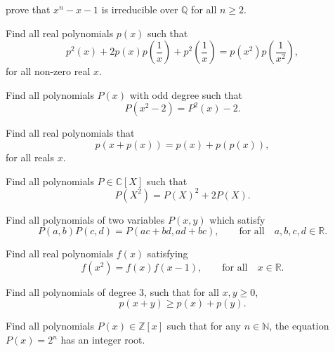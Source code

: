 \documentclass[12pt,a4paper]{memoir}
\theoremstyle{definition}
\begin{document}
\begin{question}
	prove that $x^n-x-1$ is irreducible over $\mathbb{Q}$ for all $n \geq 2$.
\end{question}



\begin{question}
	Find all real polynomials $p(x)$ such that 
	\[p^{2}(x)+2p(x)p\left(\frac{1}{x}\right)+p^{2}\left(\frac{1}{x}\right) = p(x^{2})p\left(\frac{1}{x^{2}}\right),\]
	for all non-zero real $x$.
\end{question}



\begin{question}
	Find all polynomials $P(x)$ with odd degree such that 
	\[P(x^{2}-2)=P^{2}(x)-2.\]
\end{question}



\begin{question}
	Find all real polynomials that \[p(x+p(x))=p(x)+p(p(x)),\] for all reals $x$.
\end{question}



\begin{question}
	Find all polynomials $P\in \mathbb C[X]$ such that \[P(X^{2})=P(X)^{2}+2P(X).\]
\end{question}



\begin{question}
	Find all polynomials of two variables $P(x,y)$ which satisfy
	\[P(a,b) P(c,d) = P (ac+bd, ad+bc), \qquad \text{for all} \quad a,b,c,d \in \mathbb{R}.\]
\end{question}



\begin{question}
	Find all real polynomials $f(x)$ satisfying
	\[f(x^{2})=f(x)f(x-1), \qquad \text{for all} \quad x \in \mathbb R.\]
\end{question}



\begin{question}
	Find all polynomials of degree $3$, such that for all $x,y\geq 0$, \[p(x+y)\geq p(x)+p(y).\]
\end{question}



\begin{question}
	Find all polynomials $P(x)\in \mathbb Z[x]$ such that for any $n\in \mathbb N$, the equation $P(x)=2^{n}$ has an integer root.
\end{question}
\end{document}
